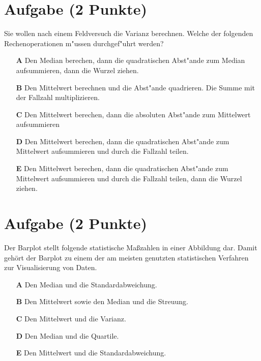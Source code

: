 \documentclass[a4paper, 9pt]{scrartcl}\usepackage[]{graphicx}\usepackage[]{xcolor}
\begin{document}
\section{Aufgabe \hfill (2 Punkte)}



Sie wollen nach einem Feldversuch die Varianz berechnen. Welche der folgenden Rechenoperationen m{"u}ssen durchgef{"u}hrt werden?



\begin{enumerate}
\item [\textbf{A} \msquare] Den Median berechen, dann die quadratischen Abst{"a}nde zum Median aufsummieren, dann die Wurzel ziehen.
\item [\textbf{B} \msquare] Den Mittelwert berechnen und die Abst{"a}nde quadrieren. Die Summe mit der Fallzahl multiplizieren.
\item [\textbf{C} \msquare] Den Mittelwert berechen, dann die absoluten Abst{"a}nde zum Mittelwert aufsummieren
\item [\textbf{D} \msquare] Den Mittelwert berechen, dann die quadratischen Abst{"a}nde zum Mittelwert aufsummieren und durch die Fallzahl teilen.
\item [\textbf{E} \msquare] Den Mittelwert berechen, dann die quadratischen Abst{"a}nde zum Mittelwert aufsummieren und durch die Fallzahl teilen, dann die Wurzel ziehen.
\end{enumerate} 

\section{Aufgabe \hfill (2 Punkte)}



Der Barplot stellt folgende statistische Ma{\ss}zahlen in einer
Abbildung dar. Damit geh{\"o}rt der Barplot zu einem der am meisten
genutzten statistischen Verfahren zur Visualisierung von Daten. 



\begin{enumerate}
\item [\textbf{A} \msquare] Den Median und die Standardabweichung.
\item [\textbf{B} \msquare] Den Mittelwert sowie den Median und die Streuung.
\item [\textbf{C} \msquare] Den Mittelwert und die Varianz.
\item [\textbf{D} \msquare] Den Median und die Quartile.
\item [\textbf{E} \msquare] Den Mittelwert und die Standardabweichung.
\end{enumerate}
\end{document}
